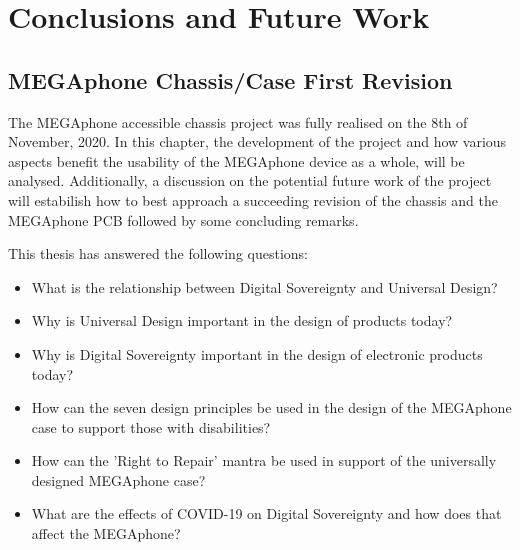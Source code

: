 
\chapter{Conclusions and Future Work} %

\label{Chapter5} %

\section{MEGAphone Chassis/Case First Revision}
The MEGAphone accessible chassis project was fully realised on the 8th of November, 2020. 
In this chapter, the development of the project and how various aspects benefit the usability of the MEGAphone device as a whole, will be analysed.
Additionally, a discussion on the potential future work of the project will estabilish how to best approach a succeeding revision of the chassis and the MEGAphone PCB followed by some concluding remarks. \vspace{5mm}

This thesis has answered the following questions:
\begin{itemize} 
    \item What is the relationship between Digital Sovereignty and Universal Design?
    \item Why is Universal Design important in the design of products today?
    \item Why is Digital Sovereignty important in the design of electronic products today?
    \item How can the seven design principles be used in the design of the MEGAphone case to support those with disabilities?
    \item How can the 'Right to Repair' mantra be used in support of the universally designed MEGAphone case?
    \item What are the effects of COVID-19 on Digital Sovereignty and how does that affect the MEGAphone? %
\end{itemize}

